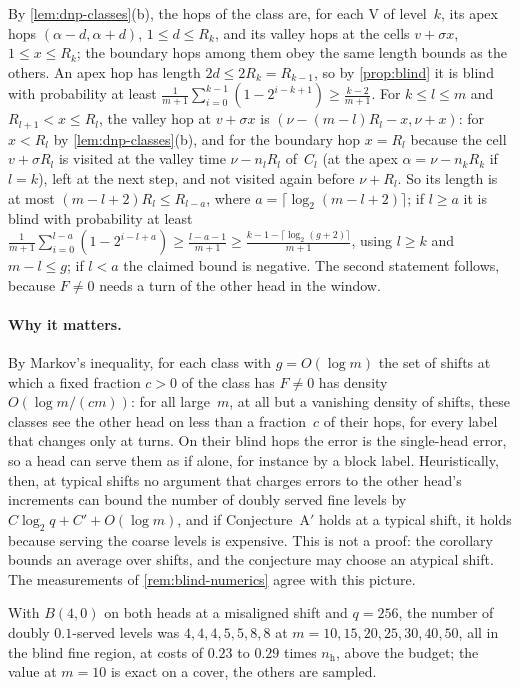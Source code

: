 \begin{informalproof}
By \cref{lem:dnp-classes}(b), the hops of the class are, for each V of level~$k$, its apex hops $(\alpha-d,\alpha+d)$,
$1\le d\le R_k$, and its valley hops at the cells $v+\sigma x$, $1\le x\le R_k$; the boundary hops among them obey the
same length bounds as the others. An apex hop has length $2d\le2R_k=R_{k-1}$, so by \cref{prop:blind} it is blind with
probability at least $\frac1{m+1}\sum_{i=0}^{k-1}(1-2^{i-k+1})\ge\frac{k-2}{m+1}$. For $k\le l\le m$ and
$R_{l+1}<x\le R_l$, the valley hop at $v+\sigma x$ is $(\nu-(m-l)R_l-x,\nu+x)$: for $x<R_l$ by \cref{lem:dnp-classes}(b),
and for the boundary hop $x=R_l$ because the cell $v+\sigma R_l$ is visited at the valley time $\nu-n_lR_l$ of~$C_l$ (at the
apex $\alpha=\nu-n_kR_k$ if $l=k$), left at the next step, and not visited again before $\nu+R_l$. So its length is at most
$(m-l+2)R_l\le R_{l-a}$, where $a=\lceil\log_2(m-l+2)\rceil$; if $l\ge a$ it is blind with probability at least
$\frac1{m+1}\sum_{i=0}^{l-a}(1-2^{i-l+a})\ge\frac{l-a-1}{m+1}\ge\frac{k-1-\lceil\log_2(g+2)\rceil}{m+1}$, using $l\ge k$
and $m-l\le g$; if $l<a$ the claimed bound is negative. The second statement follows, because $F\ne0$ needs a turn of the
other head in the window.
\end{informalproof}

\paragraph{Why it matters.} By Markov's inequality, for each class with $g=O(\log m)$ the set of shifts at which a fixed
fraction $c>0$ of the class has $F\ne0$ has density $O(\log m/(cm))$: for all large~$m$, at all but a vanishing density of
shifts, these classes see the other head on less than a fraction~$c$ of their hops, for every label that changes only at
turns. On their blind hops the error is the single-head error, so a head can serve them as if alone, for instance by a block
label. Heuristically, then, at typical shifts no argument that charges errors to the other head's increments can bound the
number of doubly served fine levels by $C\log_2q+C'+O(\log m)$, and if Conjecture~A$'$ holds at a typical shift, it holds
because serving the coarse levels is expensive. This is not a proof: the corollary bounds an average over shifts, and the
conjecture may choose an atypical shift. The measurements of \cref{rem:blind-numerics} agree with this picture.

\begin{remark}\label{rem:blind-numerics}
With $B(4,0)$ on both heads at a misaligned shift and $q=256$, the number of doubly $0.1$-served levels was
$4,4,4,5,5,8,8$ at $m=10,15,20,25,30,40,50$, all in the blind fine region, at costs of $0.23$ to $0.29$ times
$n_{\mathrm h}$, above the budget; the value at $m=10$ is exact on a cover, the others are sampled.
\end{remark}

